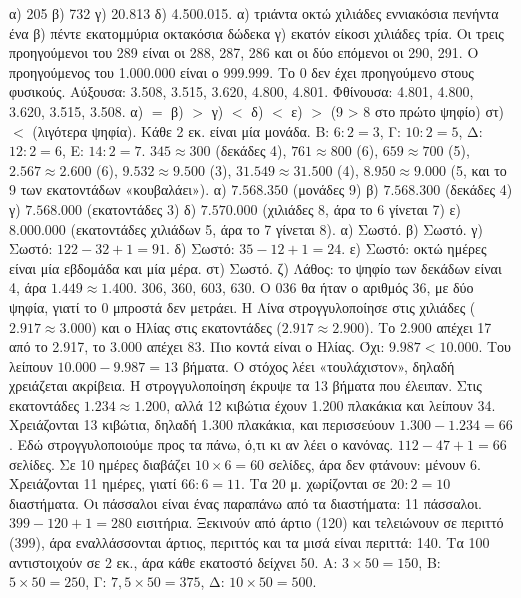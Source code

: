  α) 205 \quad β) 732 \quad γ) 20.813 \quad δ) 4.500.015.
 α) τριάντα οκτώ χιλιάδες εννιακόσια πενήντα ένα \quad β) πέντε εκατομμύρια οκτακόσια δώδεκα \quad γ) εκατόν είκοσι χιλιάδες τρία.
 Οι τρεις προηγούμενοι του 289 είναι οι 288, 287, 286 και οι δύο επόμενοι οι 290, 291. Ο προηγούμενος του 1.000.000 είναι ο 999.999. Το 0 δεν έχει προηγούμενο στους φυσικούς.
 Αύξουσα: 3.508, 3.515, 3.620, 4.800, 4.801. Φθίνουσα: 4.801, 4.800, 3.620, 3.515, 3.508.
 α) $=$ \quad β) $>$ \quad γ) $<$ \quad δ) $<$ \quad ε) $>$ (9 > 8 στο πρώτο ψηφίο) \quad στ) $<$ (λιγότερα ψηφία).
 Κάθε 2 εκ. είναι μία μονάδα. Β: $6:2=3$, Γ: $10:2=5$, Δ: $12:2=6$, Ε: $14:2=7$.
 $345\approx 300$ (δεκάδες 4), $761\approx 800$ (6), $659\approx 700$ (5), $2.567\approx 2.600$ (6), $9.532\approx 9.500$ (3), $31.549\approx 31.500$ (4), $8.950\approx 9.000$ (5, και το 9 των εκατοντάδων «κουβαλάει»).
 α) $7.568.350$ (μονάδες 9) \quad β) $7.568.300$ (δεκάδες 4) \quad γ) $7.568.000$ (εκατοντάδες 3) \quad δ) $7.570.000$ (χιλιάδες 8, άρα το 6 γίνεται 7) \quad ε) $8.000.000$ (εκατοντάδες χιλιάδων 5, άρα το 7 γίνεται 8).
 α) Σωστό. β) Σωστό. γ) Σωστό: $122-32+1=91$. δ) Σωστό: $35-12+1=24$. ε) Σωστό: οκτώ ημέρες είναι μία εβδομάδα και μία μέρα. στ) Σωστό. ζ) Λάθος: το ψηφίο των δεκάδων είναι 4, άρα $1.449\approx 1.400$.
 306, 360, 603, 630. Ο 036 θα ήταν ο αριθμός 36, με δύο ψηφία, γιατί το 0 μπροστά δεν μετράει.
 Η Λίνα στρογγυλοποίησε στις χιλιάδες ($2.917\approx 3.000$) και ο Ηλίας στις εκατοντάδες ($2.917\approx 2.900$). Το 2.900 απέχει 17 από το 2.917, το 3.000 απέχει 83. Πιο κοντά είναι ο Ηλίας.
 Όχι: $9.987<10.000$. Του λείπουν $10.000-9.987=13$ βήματα. Ο στόχος λέει «τουλάχιστον», δηλαδή χρειάζεται ακρίβεια. Η στρογγυλοποίηση έκρυψε τα 13 βήματα που έλειπαν.
 Στις εκατοντάδες $1.234\approx 1.200$, αλλά 12 κιβώτια έχουν 1.200 πλακάκια και λείπουν 34. Χρειάζονται 13 κιβώτια, δηλαδή 1.300 πλακάκια, και περισσεύουν $1.300-1.234=66$. Εδώ στρογγυλοποιούμε προς τα πάνω, ό,τι κι αν λέει ο κανόνας.
 $112-47+1=66$ σελίδες. Σε 10 ημέρες διαβάζει $10\times 6=60$ σελίδες, άρα δεν φτάνουν: μένουν 6. Χρειάζονται 11 ημέρες, γιατί $66:6=11$.
 Τα 20 μ. χωρίζονται σε $20:2=10$ διαστήματα. Οι πάσσαλοι είναι ένας παραπάνω από τα διαστήματα: 11 πάσσαλοι.
 $399-120+1=280$ εισιτήρια. Ξεκινούν από άρτιο (120) και τελειώνουν σε περιττό (399), άρα εναλλάσσονται άρτιος, περιττός και τα μισά είναι περιττά: 140.
 Τα 100 αντιστοιχούν σε 2 εκ., άρα κάθε εκατοστό δείχνει 50. Α: $3\times 50=150$, Β: $5\times 50=250$, Γ: $7{,}5\times 50=375$, Δ: $10\times 50=500$.
